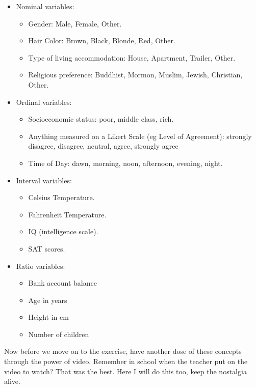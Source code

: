 \documentclass[
]{book}
\providecommand{\tightlist}{%
  \setlength{\itemsep}{0pt}\setlength{\parskip}{0pt}}
\begin{document}
\begin{itemize}
\tightlist
\item
  Nominal variables:

  \begin{itemize}
  \tightlist
  \item
    Gender: Male, Female, Other.
  \item
    Hair Color: Brown, Black, Blonde, Red, Other.
  \item
    Type of living accommodation: House, Apartment, Trailer, Other.
  \item
    Religious preference: Buddhist, Mormon, Muslim, Jewish, Christian, Other.
  \end{itemize}
\item
  Ordinal variables:

  \begin{itemize}
  \tightlist
  \item
    Socioeconomic status: poor, middle class, rich.
  \item
    Anything measured on a Likert Scale (eg Level of Agreement): strongly disagree, disagree, neutral, agree, strongly agree
  \item
    Time of Day: dawn, morning, noon, afternoon, evening, night.
  \end{itemize}
\item
  Interval variables:

  \begin{itemize}
  \tightlist
  \item
    Celsius Temperature.
  \item
    Fahrenheit Temperature.
  \item
    IQ (intelligence scale).
  \item
    SAT scores.
  \end{itemize}
\item
  Ratio variables:

  \begin{itemize}
  \tightlist
  \item
    Bank account balance
  \item
    Age in years
  \item
    Height in cm
  \item
    Number of children
  \end{itemize}
\end{itemize}

Now before we move on to the exercise, have another dose of these concepts through the power of video. Remember in school when the teacher put on the video to watch? That was the best. Here I will do this too, keep the nostalgia alive.
\end{document}
